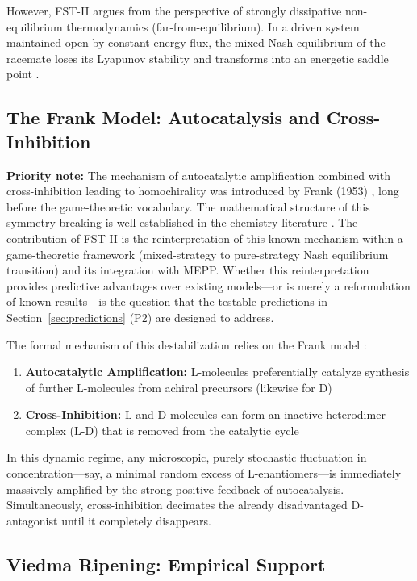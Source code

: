 \documentclass[12pt,a4paper]{article}
\theoremstyle{remark}
\begin{document}
However, FST-II argues from the perspective of strongly dissipative non-equilibrium thermodynamics (far-from-equilibrium). In a driven system maintained open by constant energy flux, the mixed Nash equilibrium of the racemate loses its Lyapunov stability and transforms into an energetic saddle point \citep{Frank1953,PlassonReview2007}.

\subsection{The Frank Model: Autocatalysis and Cross-Inhibition}

\textbf{Priority note:} The mechanism of autocatalytic amplification combined with cross-inhibition leading to homochirality was introduced by Frank (1953) \citep{Frank1953}, long before the game-theoretic vocabulary. The mathematical structure of this symmetry breaking is well-established in the chemistry literature \citep{PlassonReview2007}. The contribution of FST-II is the reinterpretation of this known mechanism within a game-theoretic framework (mixed-strategy to pure-strategy Nash equilibrium transition) and its integration with MEPP. Whether this reinterpretation provides predictive advantages over existing models---or is merely a reformulation of known results---is the question that the testable predictions in Section~\ref{sec:predictions} (P2) are designed to address.

The formal mechanism of this destabilization relies on the Frank model \citep{Frank1953}:
\begin{enumerate}
    \item \textbf{Autocatalytic Amplification:} L-molecules preferentially catalyze synthesis of further L-molecules from achiral precursors (likewise for D)
    \item \textbf{Cross-Inhibition:} L and D molecules can form an inactive heterodimer complex (L-D) that is removed from the catalytic cycle \citep{Biochirality}
\end{enumerate}

In this dynamic regime, any microscopic, purely stochastic fluctuation in concentration---say, a minimal random excess of L-enantiomers---is immediately massively amplified by the strong positive feedback of autocatalysis. Simultaneously, cross-inhibition decimates the already disadvantaged D-antagonist until it completely disappears.

\subsection{Viedma Ripening: Empirical Support}
\end{document}
